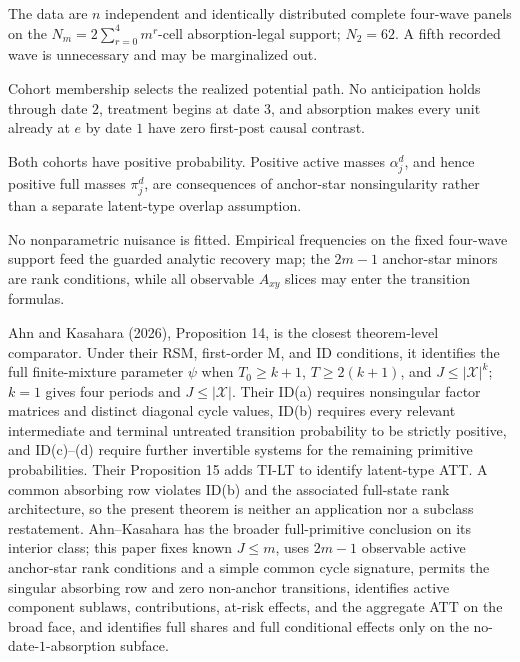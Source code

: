 The data are \(n\) independent and identically distributed complete four-wave panels on the \(N_m=2\sum_{r=0}^{4}m^r\)-cell absorption-legal support; \(N_2=62\).  A fifth recorded wave is unnecessary and may be marginalized out.

Cohort membership selects the realized potential path.  No anticipation holds through date \(2\), treatment begins at date \(3\), and absorption makes every unit already at \(e\) by date \(1\) have zero first-post causal contrast.

Both cohorts have positive probability.  Positive active masses \(\alpha_j^d\), and hence positive full masses \(\pi_j^d\), are consequences of anchor-star nonsingularity rather than a separate latent-type overlap assumption.

No nonparametric nuisance is fitted.  Empirical frequencies on the fixed four-wave support feed the guarded analytic recovery map; the \(2m-1\) anchor-star minors are rank conditions, while all observable \(A_{xy}\) slices may enter the transition formulas.

Ahn and Kasahara (2026), Proposition 14, is the closest theorem-level comparator.  Under their RSM, first-order M, and ID conditions, it identifies the full finite-mixture parameter \(\psi\) when \(T_0\geq k+1\), \(T\geq2(k+1)\), and \(J\leq|\mathcal X|^k\); \(k=1\) gives four periods and \(J\leq|\mathcal X|\).  Their ID(a) requires nonsingular factor matrices and distinct diagonal cycle values, ID(b) requires every relevant intermediate and terminal untreated transition probability to be strictly positive, and ID(c)--(d) require further invertible systems for the remaining primitive probabilities.  Their Proposition 15 adds TI-LT to identify latent-type ATT.  A common absorbing row violates ID(b) and the associated full-state rank architecture, so the present theorem is neither an application nor a subclass restatement.  Ahn--Kasahara has the broader full-primitive conclusion on its interior class; this paper fixes known \(J\leq m\), uses \(2m-1\) observable active anchor-star rank conditions and a simple common cycle signature, permits the singular absorbing row and zero non-anchor transitions, identifies active component sublaws, contributions, at-risk effects, and the aggregate ATT on the broad face, and identifies full shares and full conditional effects only on the no-date-\(1\)-absorption subface.

